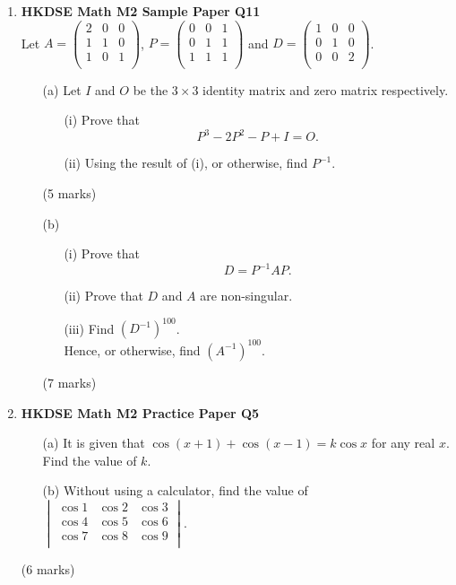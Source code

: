 \documentclass{report}
\begin{document}
\begin{enumerate}
	\item \textbf{HKDSE Math M2 Sample Paper Q11}\\
	Let $A = \begin{pmatrix}
		2 & 0 & 0\\
		1 & 1 & 0\\
		1 & 0 & 1\\
	\end{pmatrix}$, $P = \begin{pmatrix}
		0 & 0 & 1\\
		0 & 1 & 1\\
		1 & 1 & 1\\
	\end{pmatrix}$ and $D = \begin{pmatrix}
		1 & 0 & 0\\
		0 & 1 & 0\\
		0 & 0 & 2\\
	\end{pmatrix}$.
	\begin{enumerate}
		\item [(a)]Let $I$ and $O$ be the $3\times3$ identity matrix and zero matrix respectively. 
		\begin{enumerate}
			\item [(i)]Prove that $$P^3 -2P^2 - P + I = O.$$
			\item [(ii)]Using the result of (i), or otherwise, find $P^{-1}$.
		\end{enumerate}
		(5 marks)
		\item [(b)]
		\begin{enumerate}
			\item [(i)]Prove that $$D = P^{-1}AP.$$ 
			\item [(ii)]Prove that $D$ and $A$ are non-singular. 
			\item [(iii)]Find $(D^{-1})^{100}$. \\
			Hence, or otherwise, find $(A^{-1})^{100}$.
		\end{enumerate}
		(7 marks)
	\end{enumerate}

	\item \textbf{HKDSE Math M2 Practice Paper Q5}
	\begin{enumerate}
		\item [(a)]It is given that $\cos{(x+1)} + \cos{(x-1)} = k\cos{x}$ for any real $x$. Find the value of $k$. 
		\item [(b)]Without using a calculator, find the value of $\begin{vmatrix}
			\cos{1} & \cos{2} & \cos{3}\\
			\cos{4} & \cos{5} & \cos{6}\\
			\cos{7} & \cos{8} & \cos{9}\\
		\end{vmatrix}$.
	\end{enumerate}
	(6 marks)


\end{enumerate}
\end{document}
